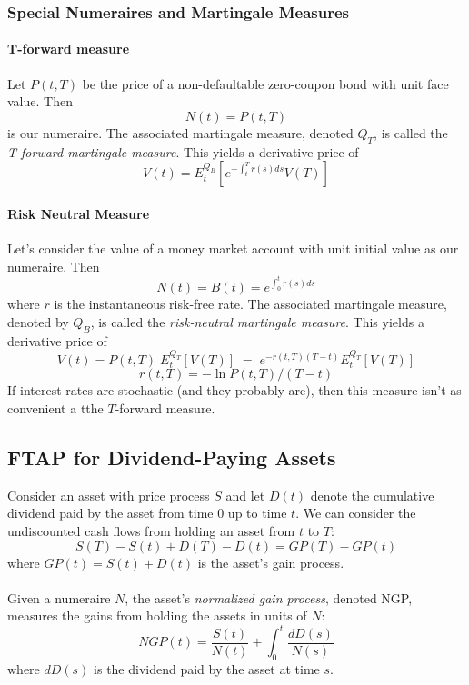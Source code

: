 \documentclass[12pt]{article}
\theoremstyle{plain}
\theoremstyle{definition}
\theoremstyle{remark}
\begin{document}
\subsubsection{Special Numeraires and Martingale Measures}

\paragraph{T-forward measure} Let $P(t,T)$ be the price of a
non-defaultable zero-coupon bond with unit face value.  Then
   \[ N(t) = P(t,T) \]
is our numeraire.  The associated martingale measure, denoted 
$Q_T$, is called the \emph{T-forward martingale measure}. This yields
a derivative price of 
   \[ V(t) = E_t^{Q_B} \left[ e^{-\int_t^T r(s) ds} V(T)\right] \]

\paragraph{Risk Neutral Measure} Let's consider the value of a money
market account with unit initial value as our numeraire.  Then
   \[ N(t) = B(t) = e^{\int_0^t r(s) ds} \]
where $r$ is the instantaneous risk-free rate.  The associated 
martingale measure, denoted by $Q_B$, is called the 
\emph{risk-neutral martingale measure}. This yields a derivative price
of 
   \[ V(t) = P(t,T) \; E_t^{Q_T}\left[V(T)\right] \; = \;
      e^{-r(t,T) (T-t)} E_t^{Q_T}\left[V(T)\right] \]
   \[ r(t,T) = -\ln{P(t,T)}/(T-t) \]
If interest rates are stochastic (and they probably are), then this
measure isn't as convenient a tthe $T$-forward measure.

\subsection{FTAP for Dividend-Paying Assets}

Consider an asset with price process $S$ and let $D(t)$ denote the
cumulative dividend paid by the asset from time 0 up to time $t$.
We can consider the undiscounted cash flows from holding an asset
from $t$ to $T$:
   \[ S(T) - S(t) + D(T) - D(t) = GP(T) - GP(t) \]
where $GP(t) = S(t) + D(t)$ is the asset's gain process.
\\
\\
Given a numeraire $N$, the asset's \emph{normalized gain process},
denoted NGP, measures the gains from holding the assets in units of $N$:
\[ NGP(t) = \frac{S(t)}{N(t)} + \int^t_0 \frac{dD(s)}{N(s)}\]
where $dD(s)$ is the dividend paid by the asset at time $s$.
\end{document}
